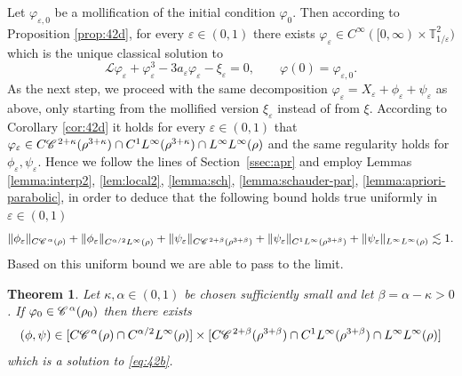 \documentclass[a4paper,11pt]{article}
\newtheorem{theorem}{Theorem}[section]
\numberwithin{equation}{section}
\newcommand{\CC}{\mathscr{C} \hspace{.1em}}
\newcommand{\LL}{\mathscr{L}}
\newcommand{\8}{\infty}
\begin{document}
 


Let $\varphi_{\varepsilon,0}$ be a mollification of the initial condition $\varphi_{0}$. Then according to Proposition \ref{prop:42d}, for every $\varepsilon\in (0,1)$ there exists $\varphi_{\varepsilon}\in C^{\infty}([0,\8)\times \mathbb{T}^{2}_{1/\varepsilon})$ which is the unique classical solution to
\begin{equation*}%
\LL \varphi_{\varepsilon} + \varphi_{\varepsilon}^3 - 3 a_{\varepsilon} \varphi_{\varepsilon} - \xi_{\varepsilon} = 0,\qquad\varphi(0)=\varphi_{\varepsilon,0}.
\end{equation*}
As the next step, we proceed with the same decomposition $\varphi_{\varepsilon}=X_{\varepsilon}+\phi_{\varepsilon}+\psi_{\varepsilon}$ as above, only starting from the mollified version $\xi_{\varepsilon}$ instead of from $\xi$. 
According to Corollary \ref{cor:42d} it holds for every $\varepsilon\in (0,1)$ that $\varphi_{\varepsilon}\in  C\CC^{2 + \kappa} (\rho^{3 + \kappa})\cap C^{1}L^{\infty}(\rho^{3+\kappa}) \cap L^{\infty}L^{\infty} (\rho)$ and the  same regularity holds for $\phi_{\varepsilon},\psi_{\varepsilon}$. Hence we follow the lines of  Section~\ref{ssec:apr} and employ  Lemmas \ref{lemma:interp2}, \ref{lem:local2}, \ref{lemma:sch}, \ref{lemma:schauder-par}, \ref{lemma:apriori-parabolic}, in order to deduce that the following bound holds true uniformly in $\varepsilon\in (0,1)$
\begin{equation}\label{eq:un42}
\|\phi_{\varepsilon}\|_{C\CC^{\alpha}(\rho)}+\|\phi_{\varepsilon}\|_{C^{\alpha/2}L^{\infty}(\rho)}+\|\psi_{\varepsilon}\|_{C\CC^{2+\beta}(\rho^{3+\beta})}+\|\psi_{\varepsilon}\|_{C^{1}L^{\infty}(\rho^{3+\beta})}+\|\psi_{\varepsilon}\|_{L^{\infty}L^{\infty}(\rho)}\lesssim 1.
\end{equation}
Based on this uniform bound we are able to pass to the limit.

\begin{theorem}\label{thm:ex42}
Let $\kappa, \alpha\in (0,1)$ be chosen sufficiently small and let $\beta=\alpha-\kappa>0$. If $\varphi_{0}\in \CC^{\alpha}(\rho_{0})$ then there exists
$$(\phi,\psi)\in [C\CC^{\alpha}(\rho)\cap C^{\alpha/2}L^{\infty}(\rho)] \times[C\CC^{2+\beta}(\rho^{3+\beta})\cap C^{1}L^{\infty}(\rho^{3+\beta})\cap L^{\infty}L^{\infty}(\rho)]$$
which is a solution to  \eqref{eq:42b}.
\end{theorem}
\end{document}
